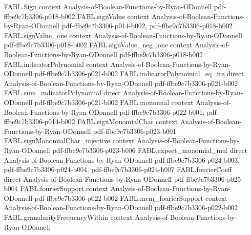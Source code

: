\begin{theorem}
\label{FABL.middleLayerFourierPolynomial_eq}
\leanok
{}
\proofstep
  {FABL.Sign}
  {context}
  {Analysis-of-Boolean-Functions-by-Ryan-ODonnell}
  {pdf-ffbe9c7b3306-p018-b002}
\proofstep
  {FABL.signValue}
  {context}
  {Analysis-of-Boolean-Functions-by-Ryan-ODonnell}
  {pdf-ffbe9c7b3306-p014-b002,
    pdf-ffbe9c7b3306-p018-b002}
\proofstep
  {FABL.signValue_one}
  {context}
  {Analysis-of-Boolean-Functions-by-Ryan-ODonnell}
  {pdf-ffbe9c7b3306-p018-b002}
\proofstep
  {FABL.signValue_neg_one}
  {context}
  {Analysis-of-Boolean-Functions-by-Ryan-ODonnell}
  {pdf-ffbe9c7b3306-p018-b002}
\proofstep
  {FABL.indicatorPolynomial}
  {context}
  {Analysis-of-Boolean-Functions-by-Ryan-ODonnell}
  {pdf-ffbe9c7b3306-p021-b002}
\proofstep
  {FABL.indicatorPolynomial_eq_ite}
  {direct}
  {Analysis-of-Boolean-Functions-by-Ryan-ODonnell}
  {pdf-ffbe9c7b3306-p021-b002}
\proofstep
  {FABL.sum_indicatorPolynomial}
  {direct}
  {Analysis-of-Boolean-Functions-by-Ryan-ODonnell}
  {pdf-ffbe9c7b3306-p021-b002}
\proofstep
  {FABL.monomial}
  {context}
  {Analysis-of-Boolean-Functions-by-Ryan-ODonnell}
  {pdf-ffbe9c7b3306-p022-b001,
    pdf-ffbe9c7b3306-p014-b002}
\proofstep
  {FABL.signMonomialChar}
  {context}
  {Analysis-of-Boolean-Functions-by-Ryan-ODonnell}
  {pdf-ffbe9c7b3306-p023-b001}
\proofstep
  {FABL.signMonomialChar_injective}
  {context}
  {Analysis-of-Boolean-Functions-by-Ryan-ODonnell}
  {pdf-ffbe9c7b3306-p023-b006}
\proofstep
  {FABL.expect_monomial_mul}
  {direct}
  {Analysis-of-Boolean-Functions-by-Ryan-ODonnell}
  {pdf-ffbe9c7b3306-p024-b003,
    pdf-ffbe9c7b3306-p024-b004,
    pdf-ffbe9c7b3306-p024-b007}
\proofstep
  {FABL.fourierCoeff}
  {direct}
  {Analysis-of-Boolean-Functions-by-Ryan-ODonnell}
  {pdf-ffbe9c7b3306-p025-b004}
\proofstep
  {FABL.fourierSupport}
  {context}
  {Analysis-of-Boolean-Functions-by-Ryan-ODonnell}
  {pdf-ffbe9c7b3306-p022-b002}
\proofstep
  {FABL.mem_fourierSupport}
  {context}
  {Analysis-of-Boolean-Functions-by-Ryan-ODonnell}
  {pdf-ffbe9c7b3306-p022-b002}
\proofstep
  {FABL.granularityFrequencyWithin}
  {context}
  {Analysis-of-Boolean-Functions-by-Ryan-ODonnell}

\end{theorem}
